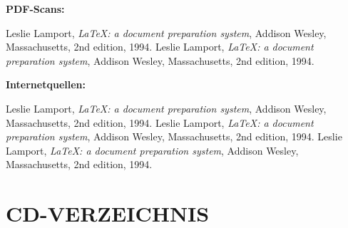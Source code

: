 \documentclass[a4paper,12pt]{article}
\begin{document}
\vspace{1cm}

\begin{large}
\textbf{PDF-Scans:}
\end{large}

\begin{thebibliography}{9}

      Leslie Lamport,
      \textit{\LaTeX: a document preparation system},
      Addison Wesley, Massachusetts,
      2nd edition,
      1994.
      Leslie Lamport,
      \textit{\LaTeX: a document preparation system},
      Addison Wesley, Massachusetts,
      2nd edition,
      1994.

\end{thebibliography}

\vspace{1cm}

\begin{large}
\textbf{Internetquellen:}
\end{large}

\begin{thebibliography}{9}

      Leslie Lamport,
      \textit{\LaTeX: a document preparation system},
      Addison Wesley, Massachusetts,
      2nd edition,
      1994.
      Leslie Lamport,
      \textit{\LaTeX: a document preparation system},
      Addison Wesley, Massachusetts,
      2nd edition,
      1994.
      Leslie Lamport,
      \textit{\LaTeX: a document preparation system},
      Addison Wesley, Massachusetts,
      2nd edition,
      1994.

\end{thebibliography}

\endgroup


\newpage
\section{CD-VERZEICHNIS}

\end{document}
